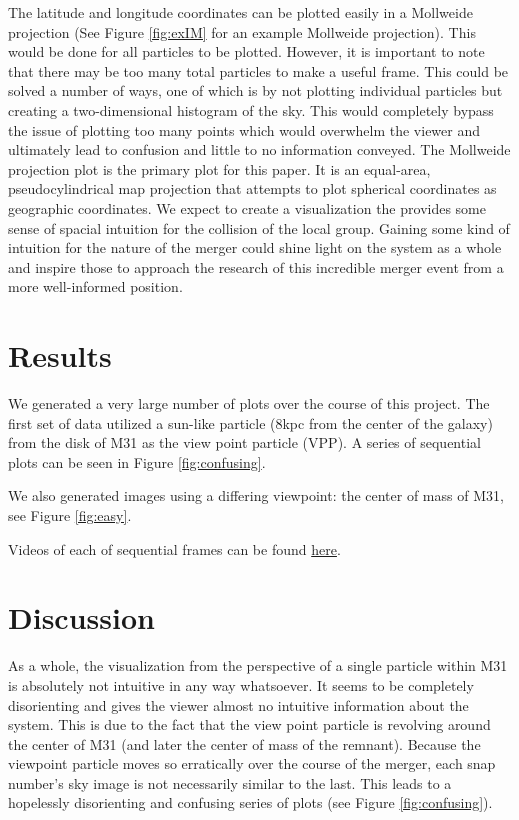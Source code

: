 \documentclass[twocolumn]{aastex63}
\begin{document}
The latitude and longitude coordinates can be plotted easily in a Mollweide projection (See Figure \ref{fig:exIM} for an example Mollweide projection). This would be done for all particles to be plotted. However, it is important to note that there may be too many total particles to make a useful frame. This could be solved a number of ways, one of which is by not plotting individual particles but creating a two-dimensional histogram of the sky. This would completely bypass the issue of plotting too many points which would overwhelm the viewer and ultimately lead to confusion and little to no information conveyed. 
The Mollweide projection plot is the primary plot for this paper. It is an equal-area, pseudocylindrical map projection that attempts to plot spherical coordinates as geographic coordinates.
We expect to create a visualization the provides some sense of spacial intuition for the collision of the local group. Gaining some kind of intuition for the nature of the merger could shine light on the system as a whole and inspire those to approach the research of this incredible merger event from a more well-informed position.


\section{Results} \label{sec:style}

We generated a very large number of plots over the course of this project. The first set of data utilized a sun-like particle (8kpc from the center of the galaxy) from the disk of M31 as the view point particle (VPP). A series of sequential plots can be seen in Figure \ref{fig:confusing}. 

We also generated images using a differing viewpoint: the center of mass of M31, see Figure \ref{fig:easy}. 

Videos of each of sequential frames can be found \href{https://www.youtube.com/playlist?list=PLa9bqRCotJq_bLtAAE6boyK872UA3x6rw}{here}.


\section{Discussion} \label{sec:style}

As a whole, the visualization from the perspective of a single particle within M31 is absolutely not intuitive in any way whatsoever. It seems to be completely disorienting and gives the viewer almost no intuitive information about the system. This is due to the fact that the view point particle is revolving around the center of M31 (and later the center of mass of the remnant). Because the viewpoint particle moves so erratically over the course of the merger, each snap number's sky image is not necessarily similar to the last. This leads to a hopelessly disorienting and confusing series of plots (see Figure \ref{fig:confusing}). 
\end{document}
